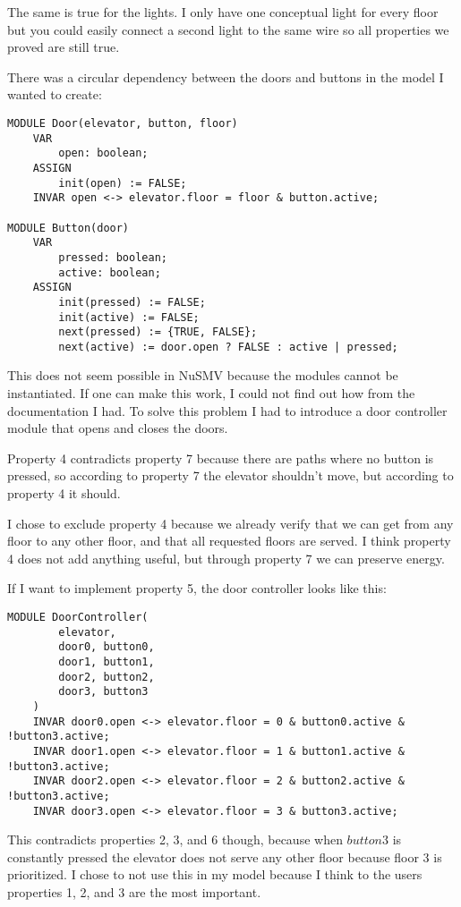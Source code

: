 \documentclass[12pt, a4paper]{article}
\begin{document}
The same is true for the lights. I only have one conceptual light for every floor but you could easily connect a second light to the same wire so all properties we proved are still true.

There was a circular dependency between the doors and buttons in the model I wanted to create:

\begin{lstlisting}
MODULE Door(elevator, button, floor)
	VAR
		open: boolean;
	ASSIGN
		init(open) := FALSE;
	INVAR open <-> elevator.floor = floor & button.active;

MODULE Button(door)
	VAR
		pressed: boolean;
		active: boolean;
	ASSIGN
		init(pressed) := FALSE;
		init(active) := FALSE;
		next(pressed) := {TRUE, FALSE};
		next(active) := door.open ? FALSE : active | pressed;
\end{lstlisting}

This does not seem possible in NuSMV because the modules cannot be instantiated. If one can make this work, I could not find out how from the documentation I had. To solve this problem I had to introduce a door controller module that opens and closes the doors.

Property 4 contradicts property 7 because there are paths where no button is pressed, so according to property 7 the elevator shouldn't move, but according to property 4 it should.

I chose to exclude property 4 because we already verify that we can get from any floor to any other floor, and that all requested floors are served. I think property 4 does not add anything useful, but through property 7 we can preserve energy.

If I want to implement property 5, the door controller looks like this:

\begin{lstlisting}[basicstyle=\small]
MODULE DoorController(
		elevator,
		door0, button0,
		door1, button1,
		door2, button2,
		door3, button3
	)
	INVAR door0.open <-> elevator.floor = 0 & button0.active & !button3.active;
	INVAR door1.open <-> elevator.floor = 1 & button1.active & !button3.active;
	INVAR door2.open <-> elevator.floor = 2 & button2.active & !button3.active;
	INVAR door3.open <-> elevator.floor = 3 & button3.active;
\end{lstlisting}

This contradicts properties 2, 3, and 6 though, because when $button3$ is constantly pressed the elevator does not serve any other floor because floor 3 is prioritized. I chose to not use this in my model because I think to the users properties 1, 2, and 3 are the most important.
\end{document}
